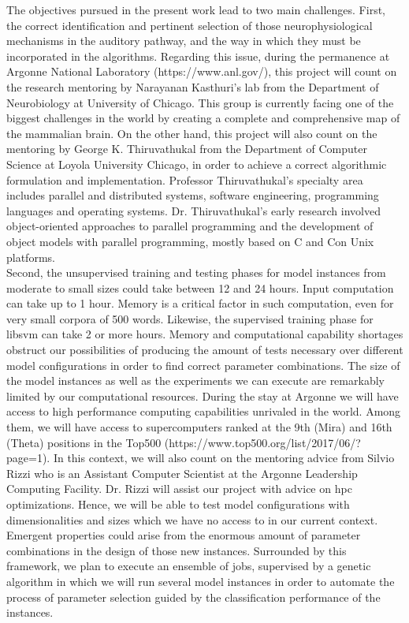 \documentclass[11pt,a4paper]{article}
\newcommand{\CC}{C\nolinebreak\hspace{-.05em}\raisebox{.4ex}{\tiny\bf +}\nolinebreak\hspace{-.10em}\raisebox{.4ex}{\tiny\bf +}}
\begin{document}
The objectives pursued in the present work lead to two main challenges.
First, the correct identification and pertinent selection of those neurophysiological
mechanisms in the auditory pathway, and the way in which they must be incorporated
in the algorithms.
Regarding this issue, during the permanence at Argonne National Laboratory (https://www.anl.gov/),
this project will count on the
research mentoring by Narayanan Kasthuri's lab
from the Department of Neurobiology at University of Chicago.
This group is currently facing one of the biggest challenges in the world by 
creating a complete and comprehensive map of the mammalian brain.
On the other hand, this project will also count on the mentoring by
George K. Thiruvathukal from the Department of Computer Science at
Loyola University Chicago,
in order to achieve a correct algorithmic formulation and implementation.
Professor Thiruvathukal's specialty area includes
parallel and distributed systems, software engineering, programming languages and operating systems.
Dr. Thiruvathukal's early research involved object-oriented approaches to parallel programming
and the development of object models with parallel programming, mostly based on C and \CC  on Unix platforms. \\

Second, the
unsupervised training and testing phases for model instances from moderate to small sizes
could take between 12 and 24 hours.
Input computation can take up to 1 hour.
Memory is a critical factor in such computation,
even for very small corpora of 500 words.
Likewise, the supervised training phase for \gls{libsvm} can take 2 or more hours.
Memory and computational capability shortages obstruct our possibilities of producing
the amount of tests necessary over different model configurations in order to find correct
parameter combinations.
The size of the model instances as well as the experiments we can execute
are remarkably limited by our computational resources.
During the stay at Argonne we will have access
to high performance computing capabilities unrivaled in the world.
Among them, we will have access to supercomputers
ranked at the 9th (Mira) and 16th (Theta) positions in the Top500
(https://www.top500.org/list/2017/06/?page=1).
In this context, we will also count on the mentoring advice from Silvio Rizzi
who is an Assistant Computer Scientist at the Argonne Leadership Computing Facility.
Dr. Rizzi will assist our project with advice on \gls{hpc} optimizations.
Hence, we will be able to test model configurations
with dimensionalities and sizes which we have no access to in our current context.
Emergent properties could arise from the enormous amount of parameter combinations in the design
of those new instances.
Surrounded by this framework, we plan to execute an ensemble of jobs,
supervised by a genetic algorithm in which we will run several model instances
in order to automate the process of parameter selection guided by the
classification performance of the instances. \\
\end{document}
